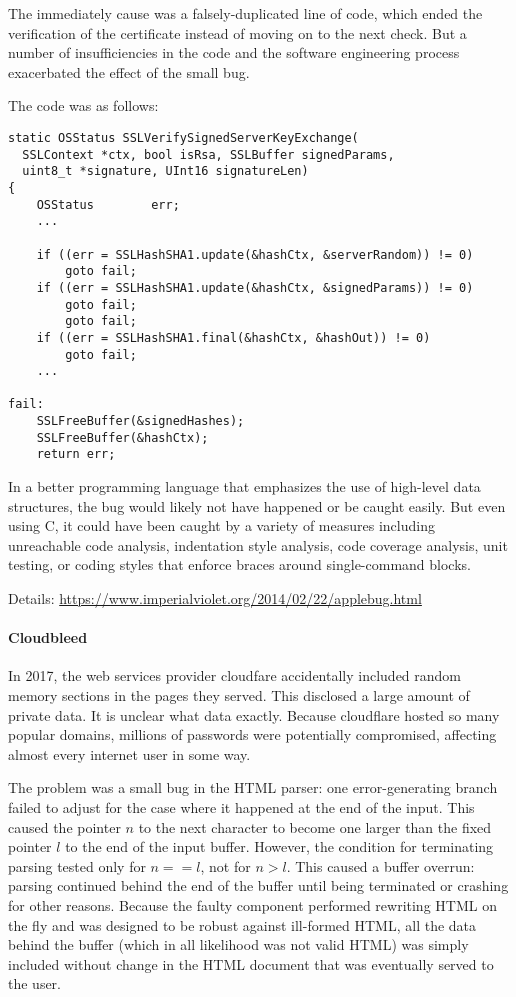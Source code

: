 The immediately cause was a falsely-duplicated line of code, which ended the verification of the certificate instead of moving on to the next check.
But a number of insufficiencies in the code and the software engineering process exacerbated the effect of the small bug.

The code was as follows:

\begin{lstlisting}
static OSStatus SSLVerifySignedServerKeyExchange(
  SSLContext *ctx, bool isRsa, SSLBuffer signedParams,
  uint8_t *signature, UInt16 signatureLen)
{
	OSStatus        err;
	...

	if ((err = SSLHashSHA1.update(&hashCtx, &serverRandom)) != 0)
		goto fail;
	if ((err = SSLHashSHA1.update(&hashCtx, &signedParams)) != 0)
		goto fail;
		goto fail;
	if ((err = SSLHashSHA1.final(&hashCtx, &hashOut)) != 0)
		goto fail;
	...

fail:
	SSLFreeBuffer(&signedHashes);
	SSLFreeBuffer(&hashCtx);
	return err;
\end{lstlisting}

In a better programming language that emphasizes the use of high-level data structures, the bug would likely not have happened or be caught easily.
But even using C, it could have been caught by a variety of measures including unreachable code analysis, indentation style analysis, code coverage analysis, unit testing, or coding styles that enforce braces around single-command blocks.
 
Details: \url{https://www.imperialviolet.org/2014/02/22/applebug.html}

\paragraph{Cloudbleed}
In 2017, the web services provider cloudfare accidentally included random memory sections in the pages they served.
This disclosed a large amount of private data.
It is unclear what data exactly.
Because cloudflare hosted so many popular domains, millions of passwords were potentially compromised, affecting almost every internet user in some way.

The problem was a small bug in the HTML parser: one error-generating branch failed to adjust for the case where it happened at the end of the input.
This caused the pointer $n$ to the next character to become one larger than the fixed pointer $l$ to the end of the input buffer.
However, the condition for terminating parsing tested only for $n==l$, not for $n>l$.
This caused a buffer overrun: parsing continued behind the end of the buffer until being terminated or crashing for other reasons.
Because the faulty component performed rewriting HTML on the fly and was designed to be robust against ill-formed HTML, all the data behind the buffer (which in all likelihood was not valid HTML) was simply included without change in the HTML document that was eventually served to the user.

